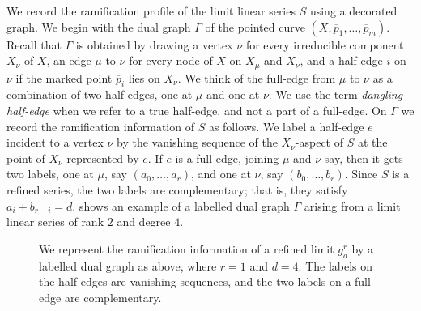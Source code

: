 \documentclass[11pt]{amsart}
\begin{document}
We record the ramification profile of the limit linear series \(S\) using a decorated graph.
We begin with the dual graph \(\Gamma\) of the pointed curve \((X, \overline p_1, \dots, \overline p_m)\).
Recall that \(\Gamma\) is obtained by drawing a vertex \(\nu\) for every irreducible component \(X_\nu\) of \(X\), an edge \(\mu\) to \(\nu\) for every node of \(X\) on \(X_\mu\) and \(X_\nu\), and a half-edge \(i\) on \(\nu\) if the marked point \(\overline p_i\) lies on \(X_\nu\).
We think of the full-edge from \(\mu\) to \(\nu\) as a combination of two half-edges, one at \(\mu\) and one at \(\nu\).
We use the term \emph{dangling half-edge} when we refer to a true half-edge, and not a part of a full-edge.
On \(\Gamma\) we record the ramification information of \(S\) as follows.
We label a half-edge \(e\) incident to a vertex \(\nu\) by the vanishing sequence of the \(X_\nu\)-aspect of \(S\) at the point of \(X_\nu\) represented by \(e\).
If \(e\) is a full edge, joining \(\mu\) and \(\nu\) say, then it gets two labels, one at \(\mu\), say \((a_0, \dots, a_r)\), and one at \(\nu\), say \((b_0, \dots, b_r)\).
Since \(S\) is a refined series, the two labels are complementary; that is, they satisfy \(a_i + b_{r-i} = d\).
 shows an example of a labelled dual graph \(\Gamma\) arising from a limit linear series of rank \(2\) and degree \(4\).

\begin{figure}
  \centering
    \caption{
    We represent the ramification information of a refined limit \(g^r_d\) by a labelled dual graph as above, where \(r = 1\) and \(d = 4\).
    The labels on the half-edges are vanishing sequences, and the two labels on a full-edge are complementary.
  }\label{fig:dualgraph}
\end{figure}
\end{document}
